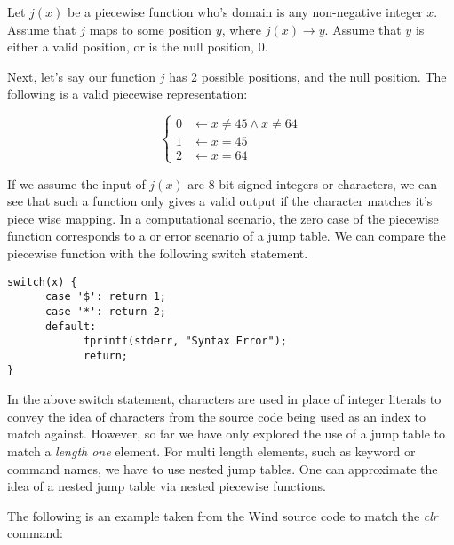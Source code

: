 \begin{theorem}
Let $j(x)$ be a piecewise function who's domain is any non-negative integer $x$. Assume that $j$ maps to some position $y$, where $j(x) \longrightarrow y$. Assume that $y$ is either a valid position, or is the null position, $0$.
\end{theorem}

Next, let's say our function $j$ has 2 possible positions, and the null position. The following is a valid piecewise representation:


\[ \begin{cases} 
      0 &\longleftarrow x \neq 45 \land x \neq 64 \\
      1 &\longleftarrow x = 45 \\
      2 &\longleftarrow x = 64 
   \end{cases}
\]

If we assume the input of $j(x)$ are 8-bit signed integers or characters, we can see that such a function only gives a valid output if the character matches it's piece wise mapping. In a computational scenario, the zero case of the piecewise function corresponds to a  or error scenario of a jump table. We can compare the piecewise function with the following switch statement.

\begin{lstlisting}[style=customc]
switch(x) {
      case '$': return 1;
      case '*': return 2;
      default:
            fprintf(stderr, "Syntax Error");
            return; 
}
\end{lstlisting}

\par In the above switch statement, characters are used in place of integer literals to convey the idea of characters from the source code being used as an index to match against. However, so far we have only explored the use of a jump table to match a \emph{length one} element. For multi length elements, such as keyword or command names, we have to use nested jump tables. One can approximate the idea of a nested jump table via nested piecewise functions.
\par The following is an example taken from the Wind source code to match the \emph{clr} command:

